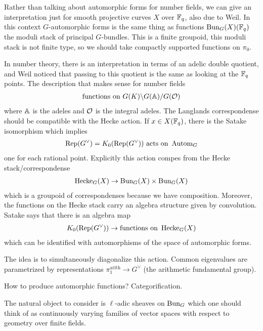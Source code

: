 \documentclass[12pt]{article}
\begin{document}
Rather than talking about automorphic forms for number fields, we can give an interpretation just for smooth projective curves $X$ over $\mathbb{F}_q$, also due to Weil. In this context $G$-automorphic forms is the same thing as functions $\operatorname{Bun}_G(X)(\mathbb{F}_q)$ the moduli stack of principal $G$-bundles. This is a finite groupoid, this moduli stack is not finite type, so we should take compactly supported functions on $\pi_0$.

In number theory, there is an interpretation in terms of an adelic double quotient, and Weil noticed that passing to this quotient is the same as looking at the $\mathbb{F}_q$ points. The description that makes sense for number fields \begin{align*}
    \text{functions on } G(K) \backslash G(\mathbb{A}) / G({\mathcal{O}})
\end{align*} where $\mathbb{A}$ is the adeles and ${\mathcal{O}}$ is the integral adeles. The Langlands correspondense should be compatible with the Hecke action. If $x\in X(\mathbb{F}_q)$, there is the Satake isomorphism which implies \begin{align*}
    \operatorname{Rep}(G^\vee) = K_0(\operatorname{Rep}(G^\vee)) \text{ acts on } \operatorname{Autom}_G
\end{align*} one for each rational point. Explicitly this action compes from the Hecke stack/correspondense \begin{align*}
    \operatorname{Hecke}_G(X) \to \operatorname{Bun}_G(X) \times \operatorname{Bun}_G(X)
\end{align*} which is a groupoid of correspondenses because we have composition. Moreover, the functions on the Hecke stack carry an algebra structure given by convolution. Satake says that there is an algebra map \begin{align*}
    K_0(\operatorname{Rep}(G^\vee)) \to \text{functions on } \operatorname{Hecke}_G(X)
\end{align*} which can be identified with automorphisms of the space of automorphic forms.


The idea is to simultaneously diagonalize this action. Common eigenvalues are parametrized by representations $\pi_1^{\text{arith}} \to G^\vee$ (the arithmetic fundamental group). 

How to produce automorphic functions? Categorification. 

The natural object to consider is $\ell$-adic sheaves on $\operatorname{Bun}_G$ which one should think of as continuously varying families of vector spaces with respect to geometry over finite fields.
\end{document}
